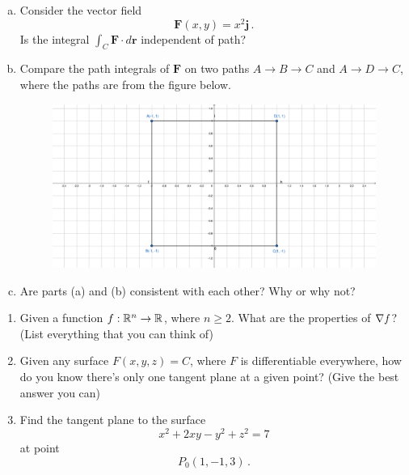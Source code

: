 \documentclass[12pt]{article}
\newcommand{\vect}{\mathbf}
\begin{document}
\newpage
\begin{problem}
    \begin{enumerate}[a.]
        \item Consider the vector field
            \begin{equation*}
                \vect{F}(x,y) = x^2 \vect{j} \,.
            \end{equation*}
            Is the integral $\int_C \vect{F} \cdot d\vect{r}$ independent of path?

        \item 
            Compare
            the path integrals of $\vect{F}$ on two paths $A\to B \to C$ and $A\to D \to C$,
            where the paths are from the figure below.
            \begin{figure}[!h]
            \includegraphics[width=1.5\textwidth]{paths.pdf}
            \end{figure}
    \item Are parts (a) and (b) consistent with each other? Why or why not?
    \end{enumerate}

\end{problem}


\newpage
\begin{problem}
\begin{enumerate}
    \item Given a function $f:\mathbb{R}^n \to \mathbb{R}$, where $n\geq 2$.
        What are the properties of $\nabla f$? (List everything that you can think of)
    \item Given any surface $F(x,y,z) = C$, where $F$ is differentiable everywhere, how do you know there's only one tangent plane at a given point?
        (Give the best answer you can)
    \item Find the tangent plane to the surface
        \begin{equation*}
            x^2 + 2xy - y^2 + z^2 =7 
        \end{equation*}
        at point
        \begin{equation*}
            P_0(1,-1,3) \,.
        \end{equation*}
\end{enumerate}
\end{problem}
\end{document}
